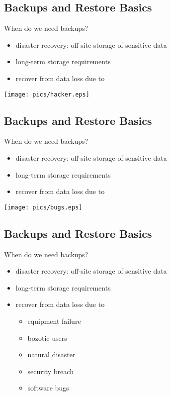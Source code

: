 \documentclass[xga]{xdvislides}
\begin{document}
\subsection{Backups and Restore Basics}
When do we need backups?
\begin{itemize}
	\item disaster recovery: off-site storage of sensitive data
	\item long-term storage requirements
	\item recover from data loss due to
\end{itemize}
\vspace*{\fill}
\begin{center}
	\texttt{[image: pics/hacker.eps]}
\end{center}
\vspace*{\fill}

\subsection{Backups and Restore Basics}
When do we need backups?
\begin{itemize}
	\item disaster recovery: off-site storage of sensitive data
	\item long-term storage requirements
	\item recover from data loss due to
\end{itemize}
\vspace*{\fill}
\begin{center}
	\texttt{[image: pics/bugs.eps]}
\end{center}
\vspace*{\fill}

\subsection{Backups and Restore Basics}
When do we need backups?
\begin{itemize}
	\item disaster recovery: off-site storage of sensitive data
	\item long-term storage requirements
	\item recover from data loss due to
		\begin{itemize}
			\item equipment failure
			\item bozotic users
			\item natural disaster
			\item security breach
			\item software bugs
		\end{itemize}
\end{itemize}
\end{document}

